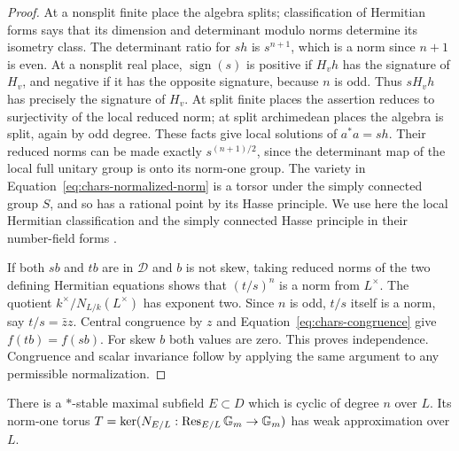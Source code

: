 \begin{proof}
At a nonsplit finite place the algebra splits; classification of
Hermitian forms says that its dimension and determinant modulo norms
determine its isometry class. The determinant ratio for $sh$ is
$s^{n+1}$, which is a norm since $n+1$ is even. At a nonsplit real
place, $\operatorname{sign}(s)$ is positive if $H_vh$ has the signature
of $H_v$, and negative if it has the opposite signature, because $n$ is
odd. Thus $sH_vh$ has precisely the signature of $H_v$. At split finite
places the assertion reduces to surjectivity of the local reduced norm;
at split archimedean places the algebra is split, again by odd degree.
These facts give local solutions of $a^*a=sh$. Their reduced norms can
be made exactly $s^{(n+1)/2}$, since the determinant map of the local
full unitary group is onto its norm-one group. The variety in
Equation~\ref{eq:chars-normalized-norm} is a torsor under the simply
connected group $S$, and so has a rational point by its Hasse principle.
We use here the local Hermitian classification and the simply connected
Hasse principle in their number-field forms
\cite{KMRT,PRbook}.

If both $sb$ and $tb$ are in $\mathcal D$ and $b$ is not skew, taking
reduced norms of the two defining Hermitian equations shows that
$(t/s)^n$ is a norm from $L^\times$. The quotient
$k^\times/N_{L/k}(L^\times)$ has exponent two. Since $n$ is odd,
$t/s$ itself is a norm, say $t/s=\bar z z$. Central congruence by $z$
and Equation~\ref{eq:chars-congruence} give $f(tb)=f(sb)$. For skew
$b$ both values are zero. This proves independence. Congruence and
scalar invariance follow by applying the same argument to any
permissible normalization.
\end{proof}

\begin{lemma}\label{lem:chars-cyclic-field}
There is a $*$-stable maximal subfield $E\subset D$ which is cyclic of
degree $n$ over $L$. Its norm-one torus
$T=\ker(N_{E/L}:\operatorname{Res}_{E/L}\mathbb G_m\to\mathbb G_m)$ has weak
approximation over $L$.
\end{lemma}

